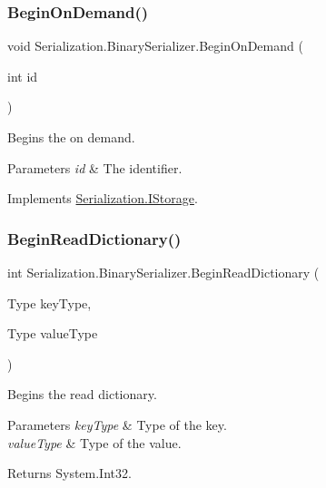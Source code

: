 \subsubsection{\texorpdfstring{Begin\+On\+Demand()}{BeginOnDemand()}}
{\footnotesize\ttfamily void Serialization.\+Binary\+Serializer.\+Begin\+On\+Demand (\begin{DoxyParamCaption}\item[{int}]{id }\end{DoxyParamCaption})\hspace{0.3cm}{\ttfamily [inline]}}



Begins the on demand. 


\begin{DoxyParams}{Parameters}
{\em id} & The identifier.\\
\hline
\end{DoxyParams}


Implements \hyperlink{interface_serialization_1_1_i_storage_aa32f1588f15cdce160d47b06b1c8ec15}{Serialization.\+I\+Storage}.

\mbox{\label{class_serialization_1_1_binary_serializer_adbc9aab40ec3aa70f3cd72ddbd6bbcba}} 
\subsubsection{\texorpdfstring{Begin\+Read\+Dictionary()}{BeginReadDictionary()}}
{\footnotesize\ttfamily int Serialization.\+Binary\+Serializer.\+Begin\+Read\+Dictionary (\begin{DoxyParamCaption}\item[{Type}]{key\+Type,  }\item[{Type}]{value\+Type }\end{DoxyParamCaption})\hspace{0.3cm}{\ttfamily [inline]}}



Begins the read dictionary. 


\begin{DoxyParams}{Parameters}
{\em key\+Type} & Type of the key.\\
\hline
{\em value\+Type} & Type of the value.\\
\hline
\end{DoxyParams}
\begin{DoxyReturn}{Returns}
System.\+Int32.
\end{DoxyReturn}


